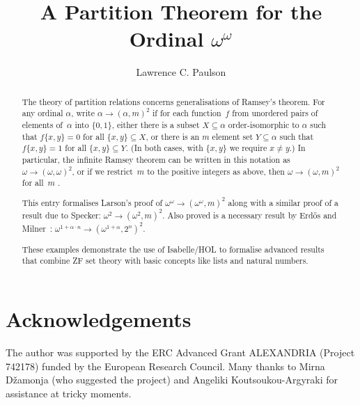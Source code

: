 \documentclass[11pt,a4paper]{article}
\begin{document}
\title{A Partition Theorem for the Ordinal $\omega^\omega$}
\author{Lawrence C. Paulson}
\maketitle

\begin{abstract}
The theory of partition relations concerns generalisations of Ramsey's theorem.
For any ordinal $\alpha$, write $\alpha \to (\alpha, m)^2$ if for each function~$f$ from unordered pairs of elements of~$\alpha$ into $\{0,1\}$, either there is a subset $X\subseteq \alpha$ order-isomorphic to $\alpha$ such that $f\{x,y\}=0$ for all $\{x,y\}\subseteq X$, or there is an $m$ element set $Y\subseteq \alpha$ such that $f\{x,y\}=1$ for all $\{x,y\}\subseteq Y$. (In both cases, with $\{x,y\}$ we require $x\not=y$.)
In particular, the infinite Ramsey theorem can be written in this notation as $\omega \to (\omega, \omega)^2$, or if we restrict~$m$ to the positive integers as above, then $\omega \to (\omega, m)^2$ for all~$m$ \cite{larson-short-proof}.

This entry formalises Larson's proof of $\omega^\omega \to (\omega^\omega, m)^2$ along with a similar proof of a result due to Specker: $\omega^2 \to (\omega^2, m)^2$. Also proved is a necessary result by Erd{\H o}s and Milner~\cite{erdos-theorem-partition,erdos-theorem-partition-corr}: $\omega^{1+\alpha\cdot n} \to (\omega^{1+\alpha}, 2^n)^2$.

These examples demonstrate the use of Isabelle/HOL to formalise advanced results that combine ZF set theory with basic concepts like lists and natural numbers.
\end{abstract}

\tableofcontents



\section{Acknowledgements}
The author was supported by the ERC Advanced Grant ALEXANDRIA (Project 742178) funded by the European Research Council. Many thanks to Mirna D\v{z}amonja (who suggested the project) and Angeliki Koutsoukou-Argyraki for assistance at tricky moments.



\end{document}
